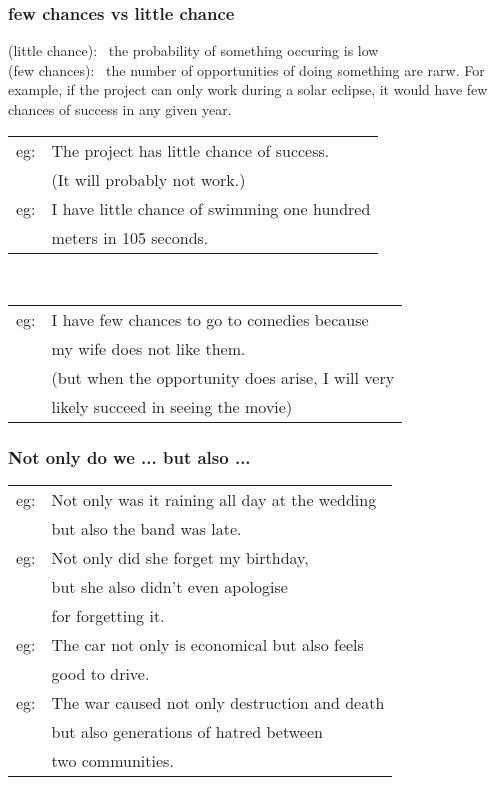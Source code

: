 \documentclass[14pt, t]{beamer}
\begin{document}
\begin{frame}[allowframebreaks]
\frametitle{few chances vs little chance} 
(little chance): \, the probability of something occuring is low \\[8pt]
(few chances): \, the number of opportunities of doing something are rarw. 
For example, if the project can only work during a solar eclipse, it would have few chances of success in any given year.  \\[8pt]
\begin{tabular}{ll}
eg: & The project has little chance of success. \\[1pt]
	& (It will probably not work.) \\[8pt]
eg: & I have little chance of swimming one hundred \\[1pt]
	& meters in 105 seconds. 
\end{tabular} \\[8pt]
\begin{tabular}{ll}
eg: & I have few chances to go to  comedies because\\[1pt]
	& my wife does not like them. \\[1pt]
	& (but when the opportunity does arise, I will very \\[1pt]
	& likely succeed in seeing the movie) 
\end{tabular}
\end{frame}
\begin{frame}
\frametitle{Not only do we ... but also ... }
\begin{tabular}{ll}
eg: & Not only was it raining all day at the wedding \\[1pt]
	& but also the band was late. \\[8pt]
eg: & Not only did she forget my birthday, \\[1pt]
	& but she also didn't even apologise \\[1pt]
	& for forgetting it. \\[8pt]
eg: & The car not only is economical but also feels\\[1pt]
	& good to drive. \\[8pt]
eg: & The war caused not only destruction and death \\[1pt]
	& but also generations of hatred between \\[1pt]
	& two communities. \\
\end{tabular} \\
\end{frame}
\end{document}
